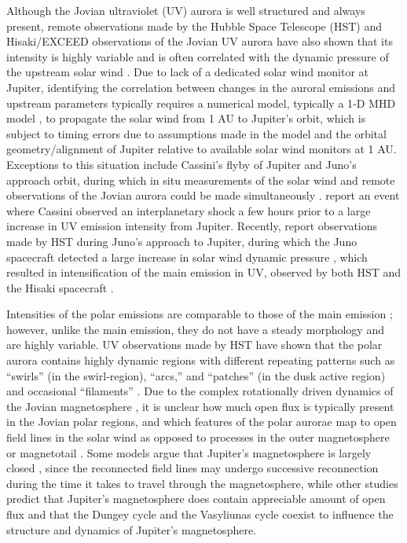 Although the Jovian ultraviolet (UV) aurora is well structured and always present, remote observations made by the Hubble Space Telescope (HST) and Hisaki/EXCEED observations of the Jovian UV aurora have also shown that its intensity is highly variable and is often correlated with the dynamic pressure of the upstream solar wind \cite{Clarke2009,Kimura2015,Kimura2018,Kita2016,Nichols2007a,Nichols2017a}. Due to lack of a dedicated solar wind monitor at Jupiter, identifying the correlation between changes in the auroral emissions and upstream parameters typically requires a numerical model, typically a 1‐D MHD model \cite{Tao2005,Zieger2008}, to propagate the solar wind from 1 AU to Jupiter's orbit, which is subject to timing errors due to assumptions made in the model and the orbital geometry/alignment of Jupiter relative to available solar wind monitors at 1 AU. Exceptions to this situation include Cassini's flyby of Jupiter and Juno's approach orbit, during which in situ measurements of the solar wind and remote observations of the Jovian aurora could be made simultaneously \cite{Gurnett2002a,Nichols2007a,Nichols2017a}.  report an event where Cassini observed an interplanetary shock a few hours prior to a large increase in UV emission intensity from Jupiter. Recently, \cite{Nichols2017a} report observations made by HST during Juno's approach to Jupiter, during which the Juno spacecraft detected a large increase in solar wind dynamic pressure \cite{Wilson2018}, which resulted in intensification of the main emission in UV, observed by both HST and the Hisaki spacecraft \cite{Kimura2017}.

Intensities of the polar emissions are comparable to those of the main emission \cite{Grodent2003a}; however, unlike the main emission, they do not have a steady morphology and are highly variable. UV observations made by HST have shown that the polar aurora contains highly dynamic regions with different repeating patterns such as “swirls” (in the swirl‐region), “arcs,” and “patches” (in the dusk active region) and occasional “filaments” \cite{Bonfond2017,Grodent2015,Grodent2003a,Nichols2009a}. Due to the complex rotationally driven dynamics of the Jovian magnetosphere \cite{Vasyliunas1983a}, it is unclear how much open flux is typically present in the Jovian polar regions, and which features of the polar aurorae map to open field lines in the solar wind as opposed to processes in the outer magnetosphere or magnetotail \cite{Cowley2003a}. Some models argue that Jupiter's magnetosphere is largely closed \cite{McComas2007}, since the reconnected field lines may undergo successive reconnection during the time it takes to travel through the magnetosphere, while other studies predict that Jupiter's magnetosphere does contain appreciable amount of open flux \cite{Cowley2008,Masters2017,Vogt2011a} and that the Dungey cycle \cite{Dungey1961b} and the Vasyliunas cycle coexist to influence the structure and dynamics of Jupiter's magnetosphere. 

